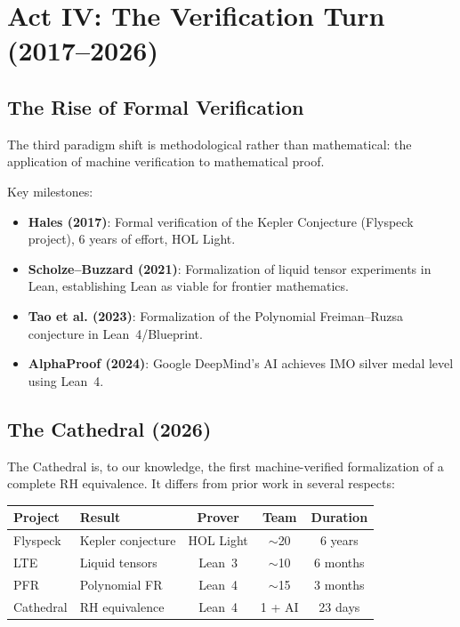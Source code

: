 \documentclass[11pt,a4paper]{article}
\begin{document}
\section{Act IV: The Verification Turn (2017--2026)}

\subsection{The Rise of Formal Verification}

The third paradigm shift is methodological rather than mathematical:
the application of machine verification to mathematical proof.

Key milestones:
\begin{itemize}
  \item \textbf{Hales (2017)}: Formal verification of the Kepler
    Conjecture (Flyspeck project), 6 years of effort, HOL Light.
  \item \textbf{Scholze--Buzzard (2021)}: Formalization of
    liquid tensor experiments in Lean, establishing Lean as viable
    for frontier mathematics.
  \item \textbf{Tao et al. (2023)}: Formalization of the
    Polynomial Freiman--Ruzsa conjecture in Lean~4/Blueprint.
  \item \textbf{AlphaProof (2024)}: Google DeepMind's AI achieves
    IMO silver medal level using Lean~4.
\end{itemize}

\subsection{The Cathedral (2026)}

The Cathedral is, to our knowledge, the first machine-verified
formalization of a complete RH equivalence. It differs from prior
work in several respects:

\begin{center}
\small
\begin{tabular}{@{}llccc@{}}
\toprule
\textbf{Project} & \textbf{Result} & \textbf{Prover} &
\textbf{Team} & \textbf{Duration} \\
\midrule
Flyspeck & Kepler conjecture & HOL Light & $\sim$20 & 6 years \\
LTE & Liquid tensors & Lean~3 & $\sim$10 & 6 months \\
PFR & Polynomial FR & Lean~4 & $\sim$15 & 3 months \\
Cathedral & RH equivalence & Lean~4 & 1 + AI & 23 days \\
\bottomrule
\end{tabular}
\end{center}
\end{document}
